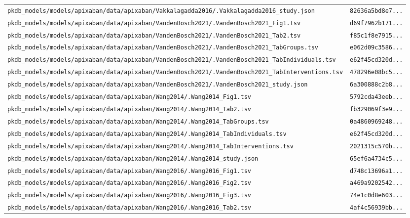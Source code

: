 \begin{longtable}{ll}
\texttt{pkdb\_models/models/apixaban/data/apixaban/Vakkalagadda2016/.Vakkalagadda2016\_study.json} & \texttt{82636a5bd8e7...} \\
\texttt{pkdb\_models/models/apixaban/data/apixaban/VandenBosch2021/.VandenBosch2021\_Fig1.tsv} & \texttt{d69f7962b171...} \\
\texttt{pkdb\_models/models/apixaban/data/apixaban/VandenBosch2021/.VandenBosch2021\_Tab2.tsv} & \texttt{f85c1f8e7915...} \\
\texttt{pkdb\_models/models/apixaban/data/apixaban/VandenBosch2021/.VandenBosch2021\_TabGroups.tsv} & \texttt{e062d09c3586...} \\
\texttt{pkdb\_models/models/apixaban/data/apixaban/VandenBosch2021/.VandenBosch2021\_TabIndividuals.tsv} & \texttt{e62f45cd320d...} \\
\texttt{pkdb\_models/models/apixaban/data/apixaban/VandenBosch2021/.VandenBosch2021\_TabInterventions.tsv} & \texttt{478296e08bc5...} \\
\texttt{pkdb\_models/models/apixaban/data/apixaban/VandenBosch2021/.VandenBosch2021\_study.json} & \texttt{6a300888c2b8...} \\
\texttt{pkdb\_models/models/apixaban/data/apixaban/Wang2014/.Wang2014\_Fig1.tsv} & \texttt{5792cda43eeb...} \\
\texttt{pkdb\_models/models/apixaban/data/apixaban/Wang2014/.Wang2014\_Tab2.tsv} & \texttt{fb329069f3e9...} \\
\texttt{pkdb\_models/models/apixaban/data/apixaban/Wang2014/.Wang2014\_TabGroups.tsv} & \texttt{0a4860969248...} \\
\texttt{pkdb\_models/models/apixaban/data/apixaban/Wang2014/.Wang2014\_TabIndividuals.tsv} & \texttt{e62f45cd320d...} \\
\texttt{pkdb\_models/models/apixaban/data/apixaban/Wang2014/.Wang2014\_TabInterventions.tsv} & \texttt{2021315c570b...} \\
\texttt{pkdb\_models/models/apixaban/data/apixaban/Wang2014/.Wang2014\_study.json} & \texttt{65ef6a4734c5...} \\
\texttt{pkdb\_models/models/apixaban/data/apixaban/Wang2016/.Wang2016\_Fig1.tsv} & \texttt{d748c13696a1...} \\
\texttt{pkdb\_models/models/apixaban/data/apixaban/Wang2016/.Wang2016\_Fig2.tsv} & \texttt{a469a9202542...} \\
\texttt{pkdb\_models/models/apixaban/data/apixaban/Wang2016/.Wang2016\_Fig3.tsv} & \texttt{74e1c0d8e603...} \\
\texttt{pkdb\_models/models/apixaban/data/apixaban/Wang2016/.Wang2016\_Tab2.tsv} & \texttt{4af4c56939bb...} \\

\end{longtable}
